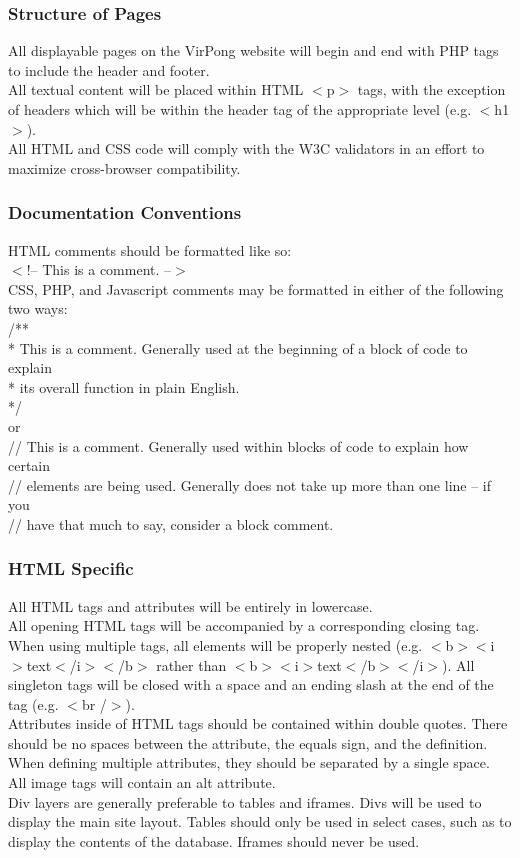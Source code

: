 		\subsubsection{Structure of Pages}
			All displayable pages on the VirPong website will begin and end with PHP tags to include the header and footer.\\All textual content will be placed within HTML $<$p$>$ tags, with the exception of headers which will be within the header tag of the appropriate level (e.g. $<$h1$>$).\\All HTML and CSS code will comply with the W3C validators in an effort to maximize cross-browser compatibility.
			
		\subsubsection{Documentation Conventions}
			HTML comments should be formatted like so:\\$<$!-- This is a comment. --$>$\\CSS, PHP, and Javascript comments may be formatted in either of the following two ways:\\/**\\* This is a comment. Generally used at the beginning of a block of code to explain\\* its overall function in plain English.\\*/\\or\\// This is a comment. Generally used within blocks of code to explain how certain\\// elements are being used. Generally does not take up more than one line -- if you\\// have that much to say, consider a block comment.
			
		\subsubsection{HTML Specific}
			All HTML tags and attributes will be entirely in lowercase.\\All opening HTML tags will be accompanied by a corresponding closing tag. When using multiple tags, all elements will be properly nested (e.g. $<$b$>$$<$i$>$text$<$/i$>$$<$/b$>$ rather than $<$b$>$$<$i$>$text$<$/b$>$$<$/i$>$). All singleton tags will be closed with a space and an ending slash at the end of the tag (e.g. $<$br /$>$).\\Attributes inside of HTML tags should be contained within double quotes. There should be no spaces between the attribute, the equals sign, and the definition. When defining multiple attributes, they should be separated by a single space.\\All image tags will contain an alt attribute.\\Div layers are generally preferable to tables and iframes. Divs will be used to display the main site layout. Tables should only be used in select cases, such as to display the contents of the database. Iframes should never be used.
			

